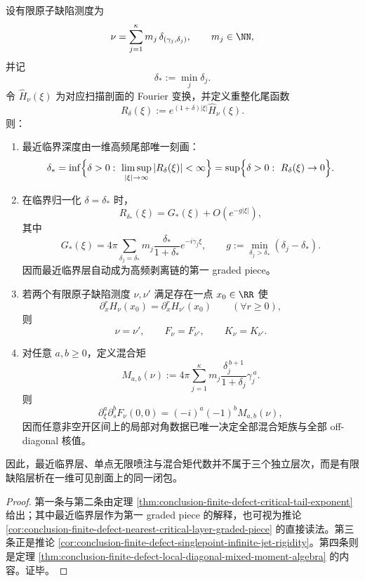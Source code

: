 \begin{theorem}\label{thm:conclusion-nearest-critical-layer-singlepoint-jet-mixedmoment-closure}
设有限原子缺陷测度为
\[
\nu=\sum_{j=1}^{\kappa}m_j\,\delta_{(\gamma_j,\delta_j)},
\qquad
m_j\in\NN,
\]
并记
\[
\delta_*:=\min_j\delta_j.
\]
令 \(\widehat H_\nu(\xi)\) 为对应扫描剖面的 Fourier 变换，并定义重整化尾函数
\[
R_\delta(\xi):=e^{(1+\delta)|\xi|}\widehat H_\nu(\xi).
\]
则：
\begin{enumerate}
  \item 最近临界深度由一维高频尾部唯一刻画：
  \[
  \delta_*
  =
  \inf\Bigl\{\delta>0:\ \limsup_{|\xi|\to\infty}|R_\delta(\xi)|<\infty\Bigr\}
  =
  \sup\Bigl\{\delta>0:\ R_\delta(\xi)\to 0\Bigr\}.
  \]
  \item 在临界归一化 \(\delta=\delta_*\) 时，
  \[
  R_{\delta_*}(\xi)=G_*(\xi)+O(e^{-g|\xi|}),
  \]
  其中
  \[
  G_*(\xi)=4\pi\sum_{\delta_j=\delta_*}m_j\frac{\delta_*}{1+\delta_*}e^{-i\gamma_j\xi},
  \qquad
  g:=\min_{\delta_j>\delta_*}(\delta_j-\delta_*).
  \]
  因而最近临界层自动成为高频剥离链的第一 graded piece。
  \item 若两个有限原子缺陷测度 \(\nu,\nu'\) 满足存在一点 \(x_0\in\RR\) 使
  \[
  \partial_x^rH_\nu(x_0)=\partial_x^rH_{\nu'}(x_0)\qquad(\forall r\ge 0),
  \]
  则
  \[
  \nu=\nu',
  \qquad
  F_\nu=F_{\nu'},
  \qquad
  K_\nu=K_{\nu'}.
  \]
  \item 对任意 \(a,b\ge 0\)，定义混合矩
  \[
  M_{a,b}(\nu):=
  4\pi\sum_{j=1}^{\kappa}m_j\frac{\delta_j^{\,b+1}}{1+\delta_j}\gamma_j^{\,a}.
  \]
  则
  \[
  \partial_\xi^a\partial_s^bF_\nu(0,0)=(-i)^a(-1)^bM_{a,b}(\nu),
  \]
  因而任意非空开区间上的局部对角数据已唯一决定全部混合矩族与全部 off-diagonal 核值。
\end{enumerate}
因此，最近临界层、单点无限喷注与混合矩代数并不属于三个独立层次，而是有限缺陷层析在一维可见剖面上的同一闭包。
\end{theorem}
\begin{proof}
第一条与第二条由定理 \ref{thm:conclusion-finite-defect-critical-tail-exponent} 给出；其中最近临界层作为第一 graded piece 的解释，也可视为推论 \ref{cor:conclusion-finite-defect-nearest-critical-layer-graded-piece} 的直接读法。第三条正是推论 \ref{cor:conclusion-finite-defect-singlepoint-infinite-jet-rigidity}。第四条则是定理 \ref{thm:conclusion-finite-defect-local-diagonal-mixed-moment-algebra} 的内容。证毕。
\end{proof}

